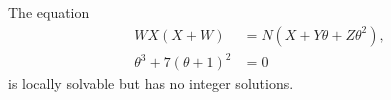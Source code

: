 \begin{proposition}\label{eq:189}
    The equation
\[
    \begin{aligned}WX(X+W)&=N(X+Y\theta+Z\theta^2),\\ \theta^3+7(\theta+1)^2&=0\end{aligned}
\]
    is locally solvable but has no integer solutions.
\end{proposition}
